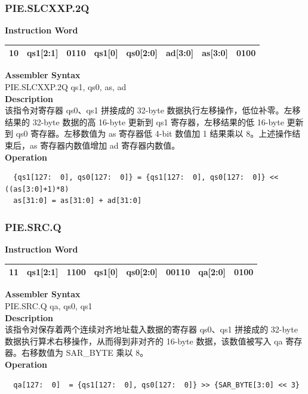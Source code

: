 \newpage
\subsubsection{PIE.SLCXXP.2Q}\label{instruction:PIESLCXXP2Q}
\setlength\tabcolsep{6pt}
\textbf{Instruction Word} \\
\begin{tabular}{|c|c|c|c|c|c|c|c|}
	\hline
	10 & qs1[2:1] & 0110 & qs1[0] & qs0[2:0] & ad[3:0] & as[3:0] & 0100 \\
	\hline
\end{tabular}

\textbf{Assembler Syntax} \\
PIE.SLCXXP.2Q qs1, qs0, as, ad \\
\textbf{Description} \\
该指令对寄存器 qs0、qs1 拼接成的 32-byte 数据执行左移操作，低位补零。左移结果的 32-byte 数据的高 16-byte 更新到 qs1 寄存器，左移结果的低 16-byte 更新到 qs0 寄存器。左移数值为 as 寄存器低 4-bit 数值加 1 结果乘以 8。上述操作结束后，as 寄存器内数值增加 ad 寄存器内数值。\\
\textbf{Operation}
\begin{lstlisting}
  {qs1[127:  0], qs0[127:  0]} = {qs1[127:  0], qs0[127:  0]} << ((as[3:0]+1)*8)
  as[31:0] = as[31:0] + ad[31:0]
\end{lstlisting}

\newpage
\subsubsection{PIE.SRC.Q}\label{instruction:PIESRCQ}
\setlength\tabcolsep{6pt}
\textbf{Instruction Word} \\
\begin{tabular}{|c|c|c|c|c|c|c|c|}
	\hline
	11 & qs1[2:1] & 1100 & qs1[0] & qs0[2:0] & 00110 & qa[2:0] & 0100 \\
	\hline
\end{tabular}

\textbf{Assembler Syntax} \\
PIE.SRC.Q qa, qs0, qs1 \\
\textbf{Description} \\
该指令对保存着两个连续对齐地址载入数据的寄存器 qs0、qs1 拼接成的 32-byte 数据执行算术右移操作，从而得到非对齐的 16-byte 数据，该数值被写入 qa 寄存器。右移数值为 SAR\_BYTE 乘以 8。\\
\textbf{Operation}
\begin{lstlisting}
  qa[127:  0]  = {qs1[127:  0], qs0[127:  0]} >> {SAR_BYTE[3:0] << 3}
\end{lstlisting}

